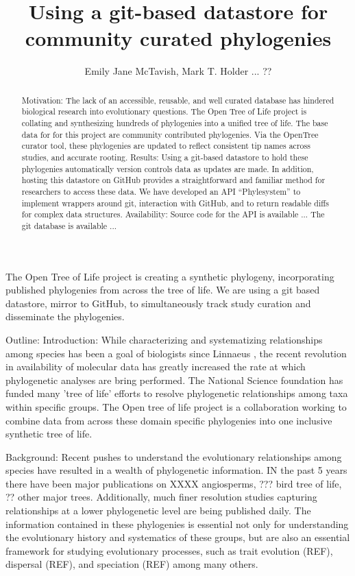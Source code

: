 \documentclass[a4paper,10pt]{article}
\title{Using a git-based datastore for community curated phylogenies}
\author{Emily Jane McTavish, Mark T. Holder ... ??}
\begin{document}
\maketitle

\begin{abstract}
Motivation:
The lack of an accessible, reusable, and well curated database has hindered biological research into evolutionary questions.
The Open Tree of Life project is collating and synthesizing hundreds of phylogenies into a unified tree of life. 
The base data for for this project are community contributed phylogenies. 
Via the OpenTree curator tool, these phylogenies are updated to reflect consistent tip names across studies, and accurate rooting. 
Results:
Using a git-based datastore to hold these phylogenies automatically version controls data as updates are made. 
In addition, hosting this datastore on GitHub provides a straightforward and familiar method for researchers to access these data. 
We have developed an API ``Phylesystem'' to implement wrappers around git, interaction with GitHub, and to return readable diffs for complex data structures.
Availability:
Source code for the API is available ...
The git database is available ...
\end{abstract}

\section{}
The Open Tree of Life project is creating a synthetic phylogeny, incorporating published phylogenies from across the tree of life.
We are using a git based datastore, mirror to GitHub, to simultaneously track study curation and disseminate the phylogenies.

Outline:
 Introduction:
 While characterizing and systematizing relationships among species has been a goal of biologists since Linnaeus \cite{Linneaus}, 
 the recent revolution in availability of molecular data has greatly increased the rate at which phylogenetic analyses are bring performed.
 The National Science foundation has funded many 'tree of life' efforts to resolve phylogenetic relationships among taxa within specific groups.
 The Open tree of life project is a collaboration working to combine data from across these domain specific phylogenies into one inclusive synthetic tree of life.
 
 
  Background:
Recent pushes to understand the evolutionary relationships among species have resulted in a wealth of phylogenetic information. 
IN the past 5 years there have been major publications on XXXX angiosperms, ??? bird tree of life, ?? other major trees.
Additionally, much finer resolution studies capturing relationships at a lower phylogenetic level are being published daily.
The information contained in these phylogenies is essential not only for understanding the evolutionary history and systematics of these groups,
but are also an essential framework for studying evolutionary processes, such as trait evolution (REF), dispersal (REF), and speciation (REF)
among many others.
\end{document}
